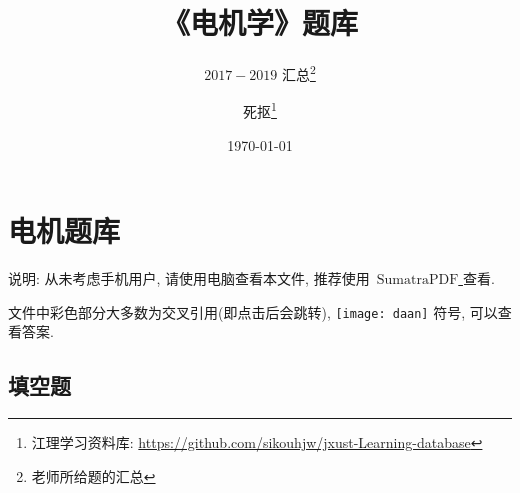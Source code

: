 \documentclass[lang=cn,11pt,marginpar=margintrue]{elegantbook}%
\title{《电机学》题库}
\subtitle{$2017-2019$ 汇总\footnote{老师所给题的汇总}}
\author{死抠\footnote{江理学习资料库: \url{https://github.com/sikouhjw/jxust-Learning-database}}}
\institute{$\mathrm{miu}$ 组织}
\date{\today}
\newcommand{\zt}[1]{\,\mathrm{#1}}
\begin{document}
\maketitle
\tableofcontents
\mainmatter
\hypersetup{pageanchor=true}
\chapter{电机题库}
说明: 从未考虑手机用户, 请使用电脑查看本文件, 推荐使用 \href{https://www.sumatrapdfreader.org/free-pdf-reader.html}{ $\zt{SumatraPDF}$ } 查看.

文件中彩色部分大多数为交叉引用(即点击后会跳转), { \texttt{[image: daan]} 符号, 可以查看答案}.
\section{填空题}
\end{document}
